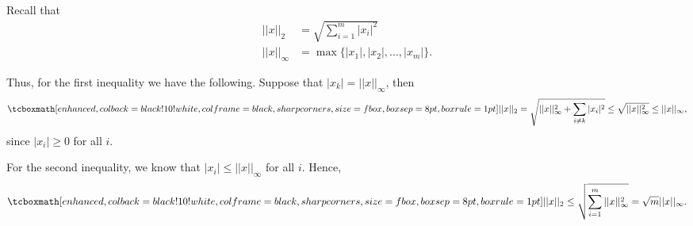 \def\duedate{09/29/22}
\def\HWnum{1}


\setlength{\headheight}{14.9998pt}
\addtolength{\topmargin}{-2.49998pt}


    

Recall that 
\begin{align}
    \label{eq:norm-def}
    ||x||_{2} &= \sqrt{\sum_{i=1}^{m} |x_{i}|^{2}} \\
    ||x||_{\infty} &= \max \{ |x_1|,|x_2|, \ldots, |x_{m}| \} 
.\end{align}

Thus, for the first inequality we have the following.
Suppose that $|x_{k}| = ||x||_{\infty}$, then
\begin{eqnarray}
    \label{eq:derive-1st-inequality}
    \eqbox{
    ||x||_{2} = \sqrt{||x||_{\infty}^2 + \sum_{i \ne k} |x_{i}|^2} \leq \sqrt{||x||_{\infty}^2} \leq ||x||_{\infty}
}
,\end{eqnarray}
since $|x_{i}| \geq 0$ for all $i$.

For the second inequality, we know that $|x_{i}| \leq ||x||_{\infty}$ for all $i$.
Hence,
\begin{eqnarray}
    \label{eq:derive-2nd-inequality}
    \eqbox{
    ||x||_{2} \leq \sqrt{\sum_{i=1}^{m} ||x||_{\infty}^2} = \sqrt{m}||x||_{\infty} 
}
.\end{eqnarray}




